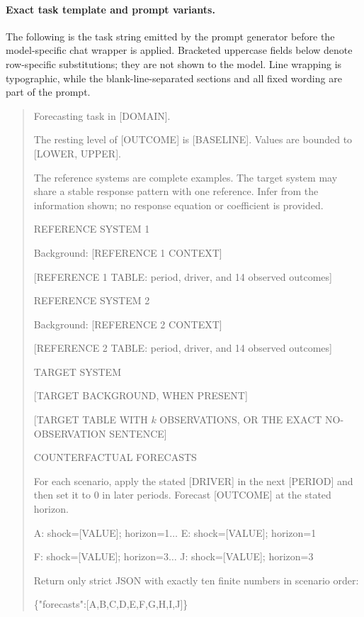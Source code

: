 \paragraph{Exact task template and prompt variants.}
\label{app:exp3-coin-prompts}
The following is the task string emitted by the prompt generator before the
model-specific chat wrapper is applied. Bracketed uppercase fields below denote
row-specific substitutions; they are not shown to the model. Line wrapping is
typographic, while the blank-line-separated sections and all fixed wording are
part of the prompt.

\begin{quote}
\begingroup\ttfamily\scriptsize\raggedright
Forecasting task in [DOMAIN].

\smallskip
The resting level of [OUTCOME] is [BASELINE]. Values are bounded to
[LOWER, UPPER].

\smallskip
The reference systems are complete examples. The target system may share a
stable response pattern with one reference. Infer from the information shown;
no response equation or coefficient is provided.

\smallskip
REFERENCE SYSTEM 1

Background: [REFERENCE 1 CONTEXT]

[REFERENCE 1 TABLE: period, driver, and 14 observed outcomes]

\smallskip
REFERENCE SYSTEM 2

Background: [REFERENCE 2 CONTEXT]

[REFERENCE 2 TABLE: period, driver, and 14 observed outcomes]

\smallskip
TARGET SYSTEM

[TARGET BACKGROUND, WHEN PRESENT]

[TARGET TABLE WITH $k$ OBSERVATIONS, OR THE EXACT NO-OBSERVATION SENTENCE]

\smallskip
COUNTERFACTUAL FORECASTS

For each scenario, apply the stated [DRIVER] in the next [PERIOD] and then set it
to 0 in later periods. Forecast [OUTCOME] at the stated horizon.

\smallskip
A: shock=[VALUE]; horizon=1\quad $\ldots$\quad
E: shock=[VALUE]; horizon=1

F: shock=[VALUE]; horizon=3\quad $\ldots$\quad
J: shock=[VALUE]; horizon=3

\smallskip
Return only strict JSON with exactly ten finite numbers in scenario order:

\{"forecasts":[A,B,C,D,E,F,G,H,I,J]\}
\endgroup
\end{quote}

